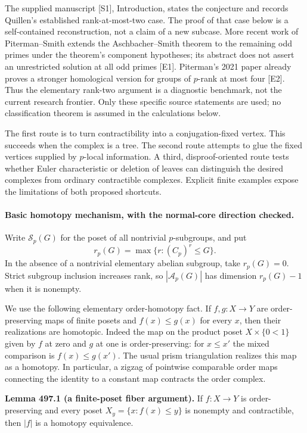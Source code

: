 \documentclass[11pt]{article}
\begin{document}
The supplied manuscript [S1], Introduction, states the conjecture and records
Quillen's established rank-at-most-two case. The proof of that case below is a
self-contained reconstruction, not a claim of a new subcase. More recent
work of Piterman--Smith extends the Aschbacher--Smith theorem to the remaining
odd primes under the theorem's component hypotheses; its abstract does not
assert an unrestricted solution at all odd primes [E1]. Piterman's 2021 paper
already proves a stronger homological version for groups of $p$-rank at most
four [E2]. Thus the elementary rank-two argument is a diagnostic benchmark,
not the current research frontier. Only these specific source statements are
used; no classification theorem is assumed in the calculations below.

The first route is to turn contractibility into a conjugation-fixed vertex.
This succeeds when the complex is a tree. The second route attempts to glue
the fixed vertices supplied by $p$-local information. A third, disproof-oriented
route tests whether Euler characteristic or deletion of leaves can distinguish
the desired complexes from ordinary contractible complexes. Explicit finite
examples expose the limitations of both proposed shortcuts.

\paragraph{Basic homotopy mechanism, with the normal-core direction checked.}
Write $\mathcal S_p(G)$ for the poset of all nontrivial $p$-subgroups, and put
\[
 r_p(G)=\max\{r:(C_p)^r\leq G\}.
\]
In the absence of a nontrivial elementary abelian subgroup, take $r_p(G)=0$.
Strict subgroup inclusion increases rank, so $|\mathcal A_p(G)|$ has dimension
$r_p(G)-1$ when it is nonempty.

We use the following elementary order-homotopy fact. If $f,g:X\to Y$ are
order-preserving maps of finite posets and $f(x)\leq g(x)$ for every $x$, then
their realizations are homotopic. Indeed the map on the product poset
$X\times\{0<1\}$ given by $f$ at zero and $g$ at one is order-preserving:
for $x\leq x'$ the mixed comparison is $f(x)\leq g(x')$.
The usual prism triangulation realizes this map as a homotopy. In particular,
a zigzag of pointwise comparable order maps connecting the identity to a
constant map contracts the order complex.

\textbf{Lemma 497.1 (a finite-poset fiber argument).}
If $f:X\to Y$ is order-preserving and every poset
$X_y=\{x:f(x)\leq y\}$ is nonempty and contractible, then $|f|$ is a
homotopy equivalence.
\end{document}
